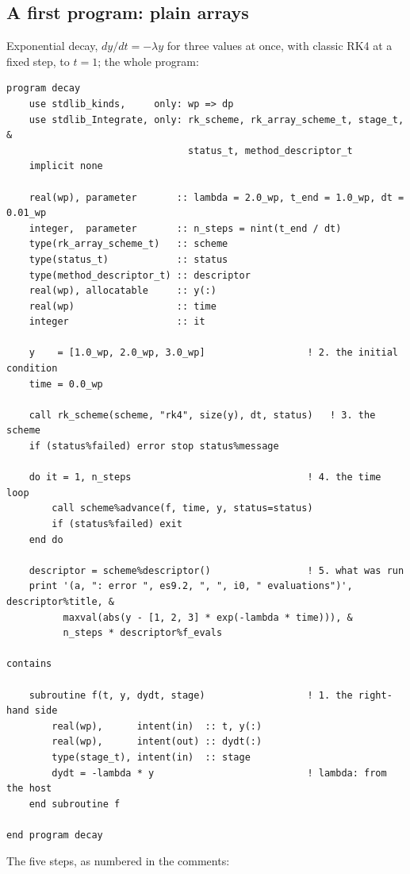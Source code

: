 \documentclass[11pt,a4paper]{article}
\begin{document}
\subsection{A first program: plain arrays}
\label{sec:first}

Exponential decay, $dy/dt = -\lambda y$ for three values at once, with
classic RK4 at a fixed step, to $t = 1$; the whole program:
\begin{lstlisting}
program decay
    use stdlib_kinds,     only: wp => dp
    use stdlib_Integrate, only: rk_scheme, rk_array_scheme_t, stage_t, &
                                status_t, method_descriptor_t
    implicit none

    real(wp), parameter       :: lambda = 2.0_wp, t_end = 1.0_wp, dt = 0.01_wp
    integer,  parameter       :: n_steps = nint(t_end / dt)
    type(rk_array_scheme_t)   :: scheme
    type(status_t)            :: status
    type(method_descriptor_t) :: descriptor
    real(wp), allocatable     :: y(:)
    real(wp)                  :: time
    integer                   :: it

    y    = [1.0_wp, 2.0_wp, 3.0_wp]                  ! 2. the initial condition
    time = 0.0_wp

    call rk_scheme(scheme, "rk4", size(y), dt, status)   ! 3. the scheme
    if (status%failed) error stop status%message

    do it = 1, n_steps                               ! 4. the time loop
        call scheme%advance(f, time, y, status=status)
        if (status%failed) exit
    end do

    descriptor = scheme%descriptor()                 ! 5. what was run
    print '(a, ": error ", es9.2, ", ", i0, " evaluations")', descriptor%title, &
          maxval(abs(y - [1, 2, 3] * exp(-lambda * time))), &
          n_steps * descriptor%f_evals

contains

    subroutine f(t, y, dydt, stage)                  ! 1. the right-hand side
        real(wp),      intent(in)  :: t, y(:)
        real(wp),      intent(out) :: dydt(:)
        type(stage_t), intent(in)  :: stage
        dydt = -lambda * y                           ! lambda: from the host
    end subroutine f

end program decay
\end{lstlisting}
The five steps, as numbered in the comments:
\end{document}
